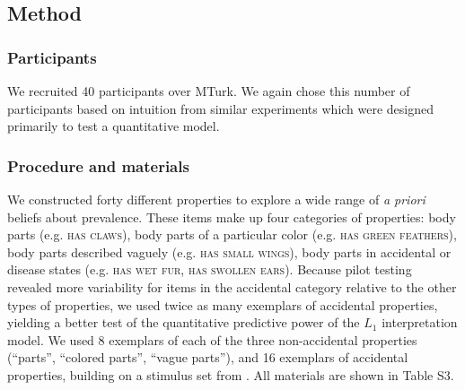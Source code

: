\documentclass[12pt,letterpaper]{article}
\begin{document}
%
%
%


\subsection*{Method}

\subsubsection*{Participants}

We recruited 40 participants over MTurk.  
We again chose this number of participants based on intuition from similar experiments which were designed primarily to test a quantitative model.


\subsubsection*{Procedure and materials}

We constructed forty different properties to explore a wide range of \emph{a priori} beliefs about prevalence. 
These items make up four categories of properties: body parts (e.g. \textsc{has claws}), body parts of a particular color (e.g. \textsc{has green feathers}), body parts described vaguely (e.g. \textsc{has small wings}),  body parts in accidental or disease states (e.g. \textsc{has wet fur}, \textsc{has swollen ears}).
Because pilot testing revealed more variability for items in the accidental category relative to the other types of properties, we used twice as many exemplars of accidental properties, yielding a better test of the quantitative predictive power of the $L_1$ interpretation model. 
We used 8 exemplars of each of the three non-accidental properties (``parts'', ``colored parts'', ``vague parts''), and 16 exemplars of accidental properties, building on a stimulus set from .
All materials are shown in Table S3.
\end{document}
